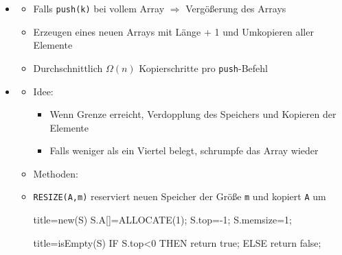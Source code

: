 \documentclass[
    12pt,
    a4paper,
    ngerman,
    color=3b,%
    marginpar=false,
    colorback=false,
    leqno,
]{tudaexercise}
\begin{document}
\begin{itemize}
    \item {}
          \begin{itemize}
              \item Falls \texttt{push(k)} bei vollem Array $\Rightarrow$ Vergößerung des Arrays
              \item Erzeugen eines neuen Arrays mit Länge + 1 und Umkopieren aller Elemente
              \item Durchschnittlich $\Omega(n)$ Kopierschritte pro \texttt{push}-Befehl
          \end{itemize}
          \clearpage
    \item {}
          \begin{itemize}
              \item Idee:
                    \begin{itemize}
                        \item Wenn Grenze erreicht, Verdopplung des Speichers und Kopieren der Elemente
                        \item Falls weniger als ein Viertel belegt, schrumpfe das Array wieder
                    \end{itemize}
              \item Methoden:
              \item[] \texttt{RESIZE(A,m)} reserviert neuen Speicher der Grö\ss e \texttt{m} und kopiert \texttt{A} um\\
                    \begin{minipage}[t]{.5\textwidth}
                        \begin{ccode}[autogobble]{title=new(S)}
                            S.A[]=ALLOCATE(1);
                            S.top=-1;
                            S.memsize=1;
                        \end{ccode}
                    \end{minipage}
                    \begin{minipage}[t]{.4\textwidth}
                        \begin{ccode}[autogobble]{title=isEmpty(S)}
                            IF S.top<0 THEN
                                return true;
                            ELSE
                                return false;
                        \end{ccode}
                    \end{minipage}
                    \\

\end{itemize}
\end{itemize}
\end{document}
